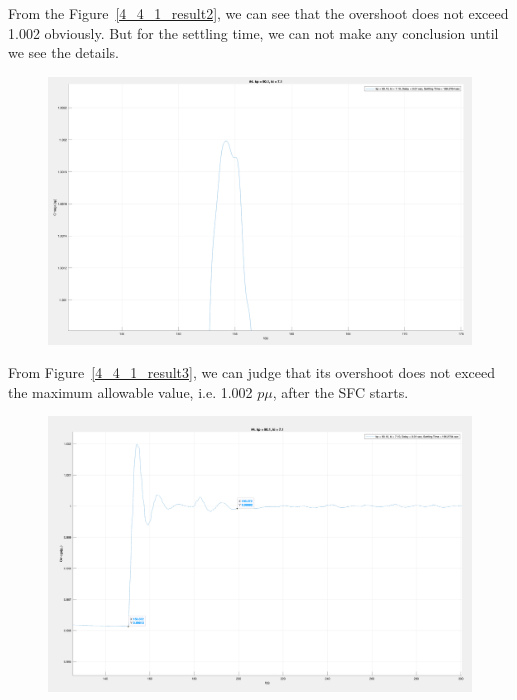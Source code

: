 From the Figure~\ref{4_4_1_result2}, we can see that the overshoot does not exceed 1.002 obviously. But for the settling time, we can not make any conclusion until we see the details.\\ 


\begin{figure}[htbp]
\centering
\includegraphics[width = .819\textwidth]{figure/4_4_1_result3.png}
\end{figure}

From Figure~\ref{4_4_1_result3}, we can judge that its overshoot does not exceed the maximum allowable value, i.e. 1.002 $p\mu$, after the SFC starts.\\

\begin{figure}[htbp]
\centering
\includegraphics[width = .819\textwidth]{figure/4_4_1_result4.png}

\end{figure}

